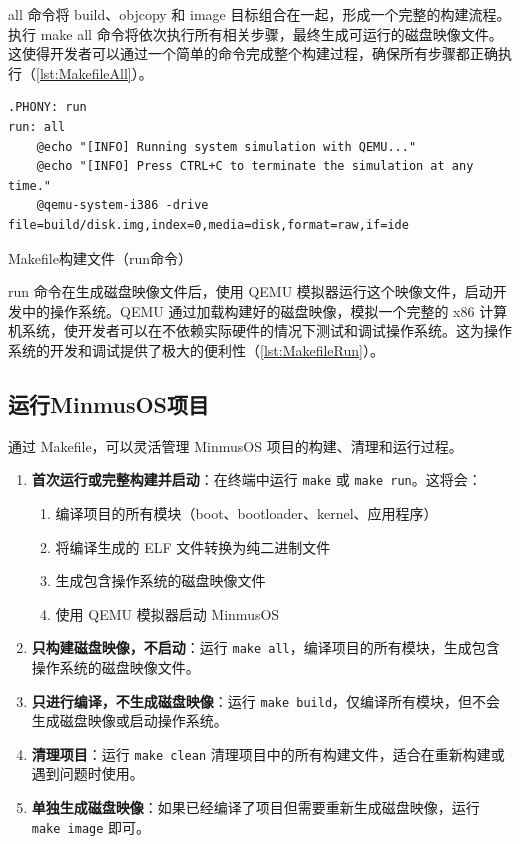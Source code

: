 all 命令将 build、objcopy 和 image 目标组合在一起，形成一个完整的构建流程。执行 make all 命令将依次执行所有相关步骤，最终生成可运行的磁盘映像文件。这使得开发者可以通过一个简单的命令完成整个构建过程，确保所有步骤都正确执行（\cref{lst:MakefileAll}）。

\begin{listing}[htbp]
    \begin{verbatim}
.PHONY: run
run: all
    @echo "[INFO] Running system simulation with QEMU..."
    @echo "[INFO] Press CTRL+C to terminate the simulation at any time."
    @qemu-system-i386 -drive file=build/disk.img,index=0,media=disk,format=raw,if=ide
    \end{verbatim}
    \caption{Makefile构建文件（run命令）}\label{lst:MakefileRun}
\end{listing}

run 命令在生成磁盘映像文件后，使用 QEMU 模拟器运行这个映像文件，启动开发中的操作系统。QEMU 通过加载构建好的磁盘映像，模拟一个完整的 x86 计算机系统，使开发者可以在不依赖实际硬件的情况下测试和调试操作系统。这为操作系统的开发和调试提供了极大的便利性（\cref{lst:MakefileRun}）。

\subsection{运行MinmusOS项目}

通过 Makefile，可以灵活管理 MinmusOS 项目的构建、清理和运行过程。

\begin{enumerate}
    \item \textbf{首次运行或完整构建并启动}：在终端中运行 \texttt{make} 或 \texttt{make run}。这将会：
          \begin{enumerate}
              \item 编译项目的所有模块（boot、bootloader、kernel、应用程序）
              \item 将编译生成的 ELF 文件转换为纯二进制文件
              \item 生成包含操作系统的磁盘映像文件
              \item 使用 QEMU 模拟器启动 MinmusOS
          \end{enumerate}
    \item \textbf{只构建磁盘映像，不启动}：运行 \texttt{make all}，编译项目的所有模块，生成包含操作系统的磁盘映像文件。
    \item \textbf{只进行编译，不生成磁盘映像}：运行 \texttt{make build}，仅编译所有模块，但不会生成磁盘映像或启动操作系统。
    \item \textbf{清理项目}：运行 \texttt{make clean} 清理项目中的所有构建文件，适合在重新构建或遇到问题时使用。
    \item \textbf{单独生成磁盘映像}：如果已经编译了项目但需要重新生成磁盘映像，运行 \texttt{make image} 即可。
\end{enumerate}
